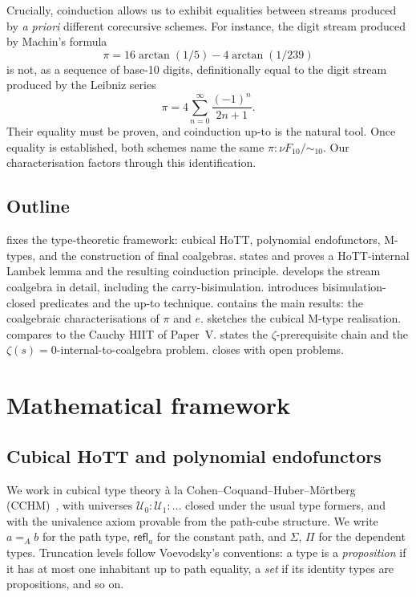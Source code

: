 \documentclass[12pt]{article}
\theoremstyle{definition}
\theoremstyle{remark}
\newcommand{\Type}{\mathcal{U}}
\newcommand{\bisim}{\mathrel{\sim}}
\newcommand{\refl}{\mathsf{refl}}
\begin{document}
Crucially, coinduction allows us to exhibit equalities between
streams produced by \emph{a priori} different corecursive schemes.
For instance, the digit stream produced by Machin's formula
\[
\pi = 16\arctan(1/5) - 4\arctan(1/239)
\]
is not, as a sequence of base-10 digits, definitionally equal to
the digit stream produced by the Leibniz series
\[
\pi = 4\sum_{n=0}^\infty \frac{(-1)^n}{2n+1}.
\]
Their equality must be proven, and coinduction up-to is the natural
tool. Once equality is established, both schemes name the same
$\pi: \nu F_{10}/{\bisim_{10}}$. Our characterisation
factors through this identification.

\subsection{Outline}

 fixes the type-theoretic framework: cubical
HoTT, polynomial endofunctors, M-types, and the construction of
final coalgebras.  states and proves a
HoTT-internal Lambek lemma and the resulting coinduction principle.
 develops the stream coalgebra in detail, including
the carry-bisimulation.  introduces
bisimulation-closed predicates and the up-to technique.
 contains the main results: the coalgebraic
characterisations of $\pi$ and $e$.  sketches the
cubical M-type realisation.  compares to
the Cauchy HIIT of Paper~V.  states the
$\zeta$-prerequisite chain and the $\zeta(s)=0$-internal-to-coalgebra
problem.  closes with open problems.

\section{Mathematical framework}\label{sec:framework}

\subsection{Cubical HoTT and polynomial endofunctors}

We work in cubical type theory \`a la Cohen--Coquand--Huber--M\"ortberg
(CCHM)~\cite{cchm}, with universes $\Type_0:\Type_1:\dots$ closed
under the usual type formers, and with the univalence axiom
provable from the path-cube structure. We write $a =_A b$ for the
path type, $\refl_a$ for the constant path, and $\Sigma$, $\Pi$ for
the dependent types. Truncation levels follow Voevodsky's
conventions: a type is a \emph{proposition} if it has at most one
inhabitant up to path equality, a \emph{set} if its identity types
are propositions, and so on.
\end{document}
